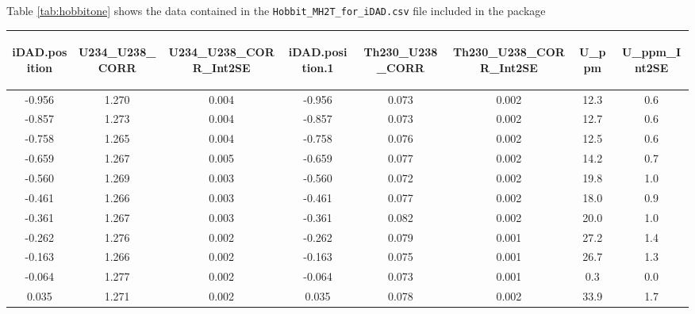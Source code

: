 \documentclass[]{elsarticle} %
\begin{document}
\newpage

Table \ref{tab:hobbitone} shows the data contained in the \texttt{Hobbit\_MH2T\_for\_iDAD.csv} file included in the package

\begin{table}[ht]
\centering
\begin{tabular}{cccccccc}
  \hline
\begin{sideways} iDAD.position \end{sideways} & \begin{sideways} U234\_U238\_CORR \end{sideways} & \begin{sideways} U234\_U238\_CORR\_Int2SE \end{sideways} & \begin{sideways} iDAD.position.1 \end{sideways} & \begin{sideways} Th230\_U238\_CORR \end{sideways} & \begin{sideways} Th230\_U238\_CORR\_Int2SE \end{sideways} & \begin{sideways} U\_ppm \end{sideways} & \begin{sideways} U\_ppm\_Int2SE \end{sideways} \\ 
  \hline
-0.956 & 1.270 & 0.004 & -0.956 & 0.073 & 0.002 & 12.3 & 0.6 \\ 
  -0.857 & 1.273 & 0.004 & -0.857 & 0.073 & 0.002 & 12.7 & 0.6 \\ 
  -0.758 & 1.265 & 0.004 & -0.758 & 0.076 & 0.002 & 12.5 & 0.6 \\ 
  -0.659 & 1.267 & 0.005 & -0.659 & 0.077 & 0.002 & 14.2 & 0.7 \\ 
  -0.560 & 1.269 & 0.003 & -0.560 & 0.072 & 0.002 & 19.8 & 1.0 \\ 
  -0.461 & 1.266 & 0.003 & -0.461 & 0.077 & 0.002 & 18.0 & 0.9 \\ 
  -0.361 & 1.267 & 0.003 & -0.361 & 0.082 & 0.002 & 20.0 & 1.0 \\ 
  -0.262 & 1.276 & 0.002 & -0.262 & 0.079 & 0.001 & 27.2 & 1.4 \\ 
  -0.163 & 1.266 & 0.002 & -0.163 & 0.075 & 0.001 & 26.7 & 1.3 \\ 
  -0.064 & 1.277 & 0.002 & -0.064 & 0.073 & 0.001 & 0.3 & 0.0 \\ 
  0.035 & 1.271 & 0.002 & 0.035 & 0.078 & 0.002 & 33.9 & 1.7 \\ 

\end{tabular}
\end{table}
\end{document}
